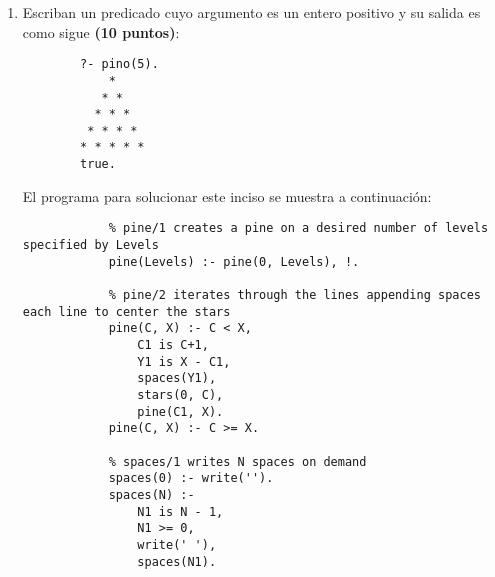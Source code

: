 \begin{enumerate}
\begin{solution}
    \end{solution}
    \item Escriban un predicado  cuyo argumento es un entero positivo y su salida es como sigue \textbf{(10 puntos)}:
    \begin{verbatim}
        ?- pino(5).
            *
           * *
          * * *
         * * * *
        * * * * *
        true.
    \end{verbatim}
    \begin{solution}
        El programa para solucionar este inciso se muestra a continuación:
        \begin{verbatim}
            % pine/1 creates a pine on a desired number of levels specified by Levels
            pine(Levels) :- pine(0, Levels), !.

            % pine/2 iterates through the lines appending spaces each line to center the stars
            pine(C, X) :- C < X, 
                C1 is C+1,
                Y1 is X - C1,
                spaces(Y1),
                stars(0, C),
                pine(C1, X).
            pine(C, X) :- C >= X.

            % spaces/1 writes N spaces on demand
            spaces(0) :- write('').
            spaces(N) :-
                N1 is N - 1,
                N1 >= 0,
                write(' '),
                spaces(N1).


\end{verbatim}
\end{solution}
\end{enumerate}
